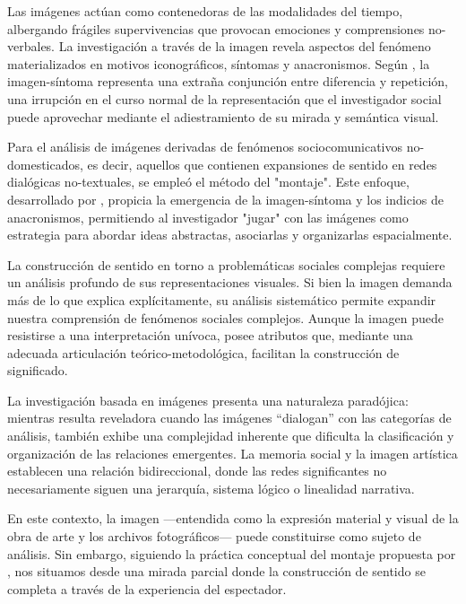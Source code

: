 Las imágenes actúan como contenedoras de las modalidades del tiempo, albergando frágiles supervivencias que provocan emociones y comprensiones no-verbales. La investigación a través de la imagen revela aspectos del fenómeno materializados en motivos iconográficos, síntomas y anacronismos. Según \parencite{Warburg2010}, la imagen-síntoma representa una extraña conjunción entre diferencia y repetición, una irrupción en el curso normal de la representación que el investigador social puede aprovechar mediante el adiestramiento de su mirada y semántica visual.

Para el análisis de imágenes derivadas de fenómenos sociocomunicativos no-domesticados, es decir, aquellos que contienen expansiones de sentido en redes dialógicas no-textuales, se empleó el método del "montaje". Este enfoque, desarrollado por \parencite{Benjamin1999}, propicia la emergencia de la imagen-síntoma y los indicios de anacronismos, permitiendo al investigador "jugar" con las imágenes como estrategia para abordar ideas abstractas, asociarlas y organizarlas espacialmente.


La construcción de sentido en torno a problemáticas sociales complejas requiere un análisis profundo de sus representaciones visuales. Si bien la imagen demanda más de lo que explica explícitamente, su análisis sistemático permite expandir nuestra comprensión de fenómenos sociales complejos. Aunque la imagen puede resistirse a una interpretación unívoca, posee atributos que, mediante una adecuada articulación teórico-metodológica, facilitan la construcción de significado.

La investigación basada en imágenes presenta una naturaleza paradójica: mientras resulta reveladora cuando las imágenes ``dialogan'' con las categorías de análisis, también exhibe una complejidad inherente que dificulta la clasificación y organización de las relaciones emergentes. La memoria social y la imagen artística establecen una relación bidireccional, donde las redes significantes no necesariamente siguen una jerarquía, sistema lógico o linealidad narrativa.

En este contexto, la imagen ---entendida como la expresión material y visual de la obra de arte y los archivos fotográficos--- puede constituirse como sujeto de análisis. Sin embargo, siguiendo la práctica conceptual del montaje propuesta por \parencite{warburg1999mnemosyne}, nos situamos desde una mirada parcial donde la construcción de sentido se completa a través de la experiencia del espectador.

